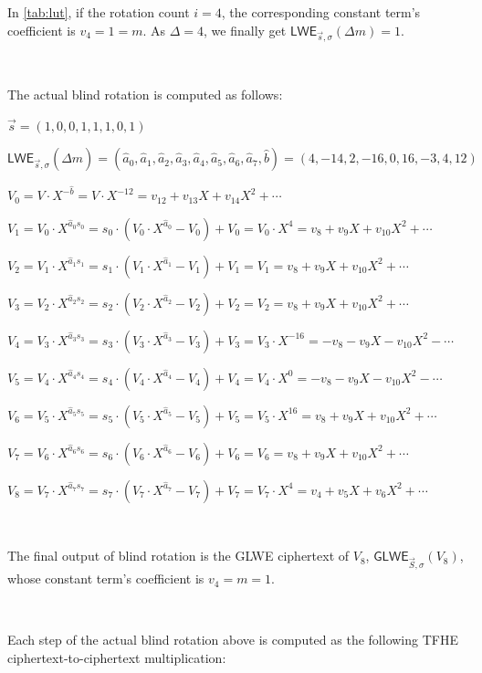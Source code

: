 \begin{enumerate}
In \autoref{tab:lut}, if the rotation count $i = 4$, the corresponding constant term's coefficient is $v_4 = 1 = m$. As $\Delta = 4$, we finally get $\textsf{LWE}_{\vec{s},\sigma}(\Delta m) = 1$. 



$ $

The actual blind rotation is computed as follows:

$\vec{s} = (1, 0, 0, 1, 1, 1, 0, 1)$

$\textsf{LWE}_{\vec{s}, \sigma}(\hat{\Delta}m) = (\hat{a}_0, \hat{a}_1, \hat{a}_2, \hat{a}_3, \hat{a}_4, \hat{a}_5, \hat{a}_6, \hat{a}_7, \hat{b}) =  (4, -14, 2, -16, 0, 16, -3, 4, 12)$

$V_0 = V \cdot X^{-\hat{b}} = V \cdot X^{-12} = v_{12} + v_{13}X + v_{14}X^2 + \cdots $

$V_1 = V_0 \cdot X^{\hat{a}_0s_0} = s_0 \cdot (V_0 \cdot X^{\hat{a}_0} - V_0) + V_0 = V_0 \cdot X^{4} = v_{8} + v_{9}X + v_{10}X^2 + \cdots$ 

$V_2 = V_1 \cdot X^{\hat{a}_1s_1} = s_1 \cdot (V_1 \cdot X^{\hat{a}_1} - V_1) + V_1 = V_1 = v_{8} + v_{9}X + v_{10}X^2 + \cdots$

$V_3 = V_2 \cdot X^{\hat{a}_2s_2} = s_2 \cdot (V_2 \cdot X^{\hat{a}_2} - V_2) + V_2 = V_2 = v_{8} + v_{9}X + v_{10}X^2 + \cdots$

$V_4 = V_3 \cdot X^{\hat{a}_3s_3} = s_3 \cdot (V_3 \cdot X^{\hat{a}_3} - V_3) + V_3 = V_3 \cdot X^{-16} = -v_{8} - v_{9}X - v_{10}X^2 - \cdots$

$V_5 = V_4 \cdot X^{\hat{a}_4s_4} = s_4 \cdot (V_4 \cdot X^{\hat{a}_4} - V_4) + V_4 = V_4 \cdot X^{0} = -v_{8} - v_{9}X - v_{10}X^2 - \cdots$

$V_6 = V_5 \cdot X^{\hat{a}_5s_5} = s_5 \cdot (V_5 \cdot X^{\hat{a}_5} - V_5) + V_5 = V_5 \cdot X^{16} = v_{8} + v_{9}X + v_{10}X^2 + \cdots$

$V_7 = V_6 \cdot X^{\hat{a}_6s_6} = s_6 \cdot (V_6 \cdot X^{\hat{a}_6} - V_6) + V_6 = V_6 = v_{8} + v_{9}X + v_{10}X^2 + \cdots$

$V_8 = V_7 \cdot X^{\hat{a}_7s_7} = s_7 \cdot (V_7 \cdot X^{\hat{a}_7} - V_7) + V_7 = V_7 \cdot X^{4} = v_{4} + v_5X + v_6X^2 + \cdots $

$ $

The final output of blind rotation is the GLWE ciphertext of $V_8$, $\textsf{GLWE}_{\vec{S}, \sigma}(V_8)$, whose constant term's coefficient is $v_4 = m = 1$. 

$ $

Each step of the actual blind rotation above is computed as the following TFHE ciphertext-to-ciphertext multiplication:


\end{enumerate}
